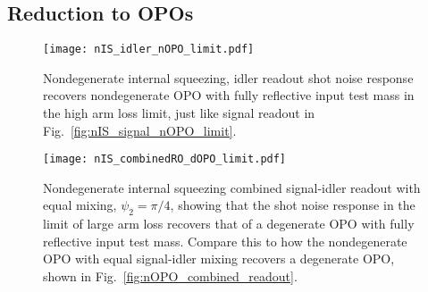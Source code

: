 \subsection{Reduction to OPOs}

\begin{figure}
	\centering
	\texttt{[image: nIS\_idler\_nOPO\_limit.pdf]}
	\caption{  Nondegenerate internal squeezing, idler readout shot noise response recovers nondegenerate OPO with fully reflective input test mass in the high arm loss limit, just like signal readout in Fig.~\ref{fig:nIS_signal_nOPO_limit}.}
	\label{fig:nIS_idler_nOPO_limit}
\end{figure}
\begin{figure}
	\centering
	\texttt{[image: nIS\_combinedRO\_dOPO\_limit.pdf]}
	\caption{  Nondegenerate internal squeezing combined signal-idler readout with equal mixing, $\psi_2=\pi/4$, showing that the shot noise response in the limit of large arm loss recovers that of a degenerate OPO with fully reflective input test mass. Compare this to how the nondegenerate OPO with equal signal-idler mixing recovers a degenerate OPO, shown in Fig.~\ref{fig:nOPO_combined_readout}.}
	\label{fig:nIS_combinedRO_dOPO_limit}
\end{figure}

